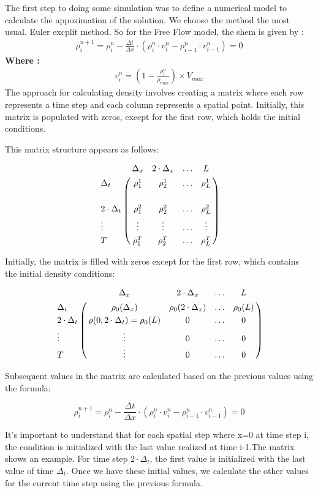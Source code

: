 \documentclass{article}
\begin{document}
		
		The first step to doing some simulation was to define a numerical model to calculate the appoximation of the solution.
		We choose the method the most usual. Euler excplit method.
		So for the Free Flow model, the shem is given by : 
		\begin{align*}
			\boxed{\rho_{i}^{n+1} = \rho_i^n - \frac{\Delta t}{\Delta x} \cdot \left(\rho_i^n \cdot v_i^n - \rho_{i-1}^n \cdot v_{i-1}^n \right)
				=0}
		\end{align*}
		\textbf{Where : }
		\begin{align*}
			\boxed{v_i^n = \left( 1 - \frac{\rho_i^n}{\rho_{max}}\right)  \times V_{max}}
		\end{align*}
		\newpage
		The approach for calculating density involves creating a matrix where each row represents a time step and each column represents a spatial point. Initially, this matrix is populated with zeros, except for the first row, which holds the initial conditions.
		
		This matrix structure appears as follows:
		
		\begin{align*}
			\bordermatrix { 
				& \Delta_x & 2\cdot \Delta_x & \hdots & L \cr 
				\Delta_t & \rho_1^1 & \rho_2^1 & \hdots & \rho_L^1 \cr \cr
				2\cdot \Delta_t & \rho_1^2 & \rho_2^2 & \hdots & \rho_L^2\cr
				\vdots & \vdots & \vdots & \hdots & \vdots \cr
				T & \rho_1^T & \rho_2^T & \hdots & \rho_L^T}
		\end{align*}
		

		Initially, the matrix is filled with zeros except for the first row, which contains the initial density conditions:

		\begin{align*}
			\bordermatrix { 
				& \Delta_x & 2\cdot \Delta_x & \hdots & L \cr 
				\Delta_t & \rho_0(\Delta_x) & \rho_0(2 \cdot \Delta_x) & \hdots & \rho_0(L) \cr 
				2\cdot \Delta_t & \rho(0,2\cdot \Delta_t)=\rho_0(L) & 0 & \hdots & 0\cr
				\vdots & \vdots & 0 & \hdots & 0 \cr
				T & \vdots & 0 & \hdots & 0}
		\end{align*}

		 
	
		Subsequent values in the matrix are calculated based on the previous values using the formula:
		
		\[
		\rho_{i}^{n+1} = \rho_i^n - \frac{\Delta t}{\Delta x} \cdot \left(\rho_i^n \cdot v_i^n - \rho_{i-1}^n \cdot v_{i-1}^n \right) = 0
		\]
		
		It's important to understand that for each spatial step where x=0 at time step i, the condition is initialized with the last value realized at time i-1.The matrix shows an example. For time step $2\cdot \Delta_t$, the first value is initialized with the last value of time $\Delta_t$. Once we have these initial values, we calculate the other values for the current time step using the previous formula.
\end{document}
